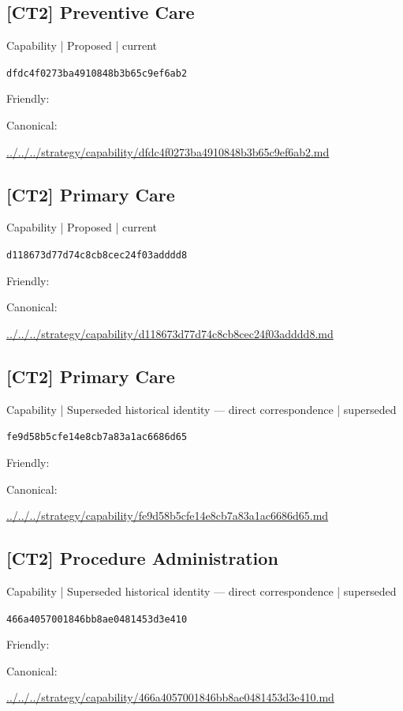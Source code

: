 \documentclass[10pt,a4paper]{article}
\begin{document}
\subsection*{[CT2] Preventive Care}
{\small Capability | Proposed | current}\par
\texttt{dfdc4f0273ba4910848b3b65c9ef6ab2}\par
Friendly: \par
Canonical: \par
{\footnotesize\url{../../../strategy/capability/dfdc4f0273ba4910848b3b65c9ef6ab2.md}}\par
\subsection*{[CT2] Primary Care}
{\small Capability | Proposed | current}\par
\texttt{d118673d77d74c8cb8cec24f03adddd8}\par
Friendly: \par
Canonical: \par
{\footnotesize\url{../../../strategy/capability/d118673d77d74c8cb8cec24f03adddd8.md}}\par
\subsection*{[CT2] Primary Care}
{\small Capability | Superseded historical identity — direct correspondence | superseded}\par
\texttt{fe9d58b5cfe14e8cb7a83a1ac6686d65}\par
Friendly: \par
Canonical: \par
{\footnotesize\url{../../../strategy/capability/fe9d58b5cfe14e8cb7a83a1ac6686d65.md}}\par
\subsection*{[CT2] Procedure Administration}
{\small Capability | Superseded historical identity — direct correspondence | superseded}\par
\texttt{466a4057001846bb8ae0481453d3e410}\par
Friendly: \par
Canonical: \par
{\footnotesize\url{../../../strategy/capability/466a4057001846bb8ae0481453d3e410.md}}\par
\end{document}
